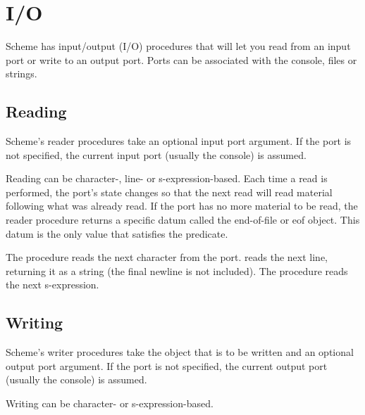 \chapter{I/O}

Scheme has input/output (I/O) procedures that will let you
read from an input port or write to an output port.  Ports
can be associated with the console, files or strings.

\section{Reading}

Scheme’s reader procedures take an optional input port
argument.  If the port is not specified, the current input
port (usually the console) is assumed.


Reading can be character-, line- or s-expression-based.
Each time a read is performed, the port’s state changes so
that the next read will read material following what was
already read.  If the port has no more material to be read,
the reader procedure returns a specific datum called the
end-of-file or eof object.  This datum is the only value
that satisfies the  predicate.


The procedure  reads the next character from
the port.   reads the next line, returning it
as a string (the final newline is not included).  The
procedure  reads the next s-expression.

\section{Writing}

Scheme’s writer procedures take the object that is to be
written and an optional output port argument.  If the port
is not specified, the current output port (usually the
console) is assumed.

Writing can be character- or s-expression-based.


